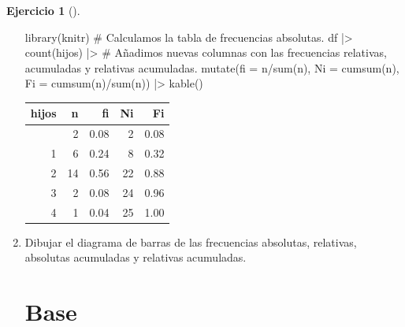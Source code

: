 \documentclass[
  spanish,
  a4paper,
]{scrreport}
\newenvironment{Shaded}{\begin{snugshade}}{\end{snugshade}}
\newcommand{\AttributeTok}[1]{\textcolor[rgb]{0.40,0.45,0.13}{#1}}
\newcommand{\CommentTok}[1]{\textcolor[rgb]{0.37,0.37,0.37}{#1}}
\newcommand{\FunctionTok}[1]{\textcolor[rgb]{0.28,0.35,0.67}{#1}}
\newcommand{\NormalTok}[1]{\textcolor[rgb]{0.00,0.23,0.31}{#1}}
\newcommand{\SpecialCharTok}[1]{\textcolor[rgb]{0.37,0.37,0.37}{#1}}
\theoremstyle{definition}
\newtheorem{exercise}{Ejercicio}[chapter]
\theoremstyle{remark}
\begin{document}
\begin{exercise}[]
\begin{enumerate}
\begin{tcolorbox}
\begin{Shaded}
\begin{Highlighting}[]
\FunctionTok{library}\NormalTok{(knitr)}
\CommentTok{\# Calculamos la tabla de frecuencias absolutas.}
\NormalTok{df }\SpecialCharTok{|\textgreater{}} \FunctionTok{count}\NormalTok{(hijos) }\SpecialCharTok{|\textgreater{}}
    \CommentTok{\# Añadimos nuevas columnas con las frecuencias relativas, acumuladas y relativas acumuladas.}
    \FunctionTok{mutate}\NormalTok{(}\AttributeTok{fi =}\NormalTok{ n}\SpecialCharTok{/}\FunctionTok{sum}\NormalTok{(n), }\AttributeTok{Ni =} \FunctionTok{cumsum}\NormalTok{(n), }\AttributeTok{Fi =} \FunctionTok{cumsum}\NormalTok{(n)}\SpecialCharTok{/}\FunctionTok{sum}\NormalTok{(n)) }\SpecialCharTok{|\textgreater{}}
    \FunctionTok{kable}\NormalTok{()}
\end{Highlighting}
\end{Shaded}

  \begin{longtable}[]{@{}rrrrr@{}}
  \toprule\noalign{}
  hijos & n & fi & Ni & Fi \\
  \midrule\noalign{}
  \endhead
  \bottomrule\noalign{}
  \endlastfoot
  0 & 2 & 0.08 & 2 & 0.08 \\
  1 & 6 & 0.24 & 8 & 0.32 \\
  2 & 14 & 0.56 & 22 & 0.88 \\
  3 & 2 & 0.08 & 24 & 0.96 \\
  4 & 1 & 0.04 & 25 & 1.00 \\
  \end{longtable}

  \end{tcolorbox}
\item
  Dibujar el diagrama de barras de las frecuencias absolutas, relativas,
  absolutas acumuladas y relativas acumuladas.

  \begin{tcolorbox}[enhanced jigsaw, breakable, leftrule=.75mm, toptitle=1mm, rightrule=.15mm, opacitybacktitle=0.6, left=2mm, colframe=quarto-callout-tip-color-frame, titlerule=0mm, toprule=.15mm, opacityback=0, bottomtitle=1mm, coltitle=black, colbacktitle=quarto-callout-tip-color!10!white, title=\textcolor{quarto-callout-tip-color}{\faLightbulb}\hspace{0.5em}{Solución}, arc=.35mm, bottomrule=.15mm, colback=white]

  \section{Base}


\end{tcolorbox}
\end{enumerate}
\end{exercise}
\end{document}
